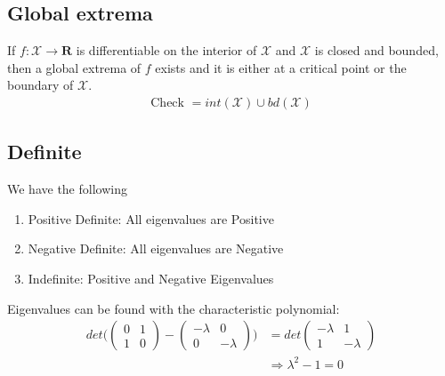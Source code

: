 \documentclass[8pt]{extarticle}
\newcommand{\R}{{\mathbb R}}
\newcommand{\X}{{\mathcal X}}
\newcommand{\ra}{{\rightarrow}}
\newcommand{\Ra}{{\Rightarrow}}
\def\R{\mathbf{R}}
\begin{document}
\begin{multicols*}{3}
  \subsection{Global extrema}
  If $f: \X \ra \R$ is differentiable on the interior
  of $\X$ and $\X$ is closed and bounded, then a global
  extrema of $f$ exists and it is either at a critical point
  or the boundary of $\X$.
  \begin{align*}
    \text{Check } = int(\X) \cup bd(\X)
  \end{align*}
  \subsection{Definite}
  We have the following
  \begin{enumerate}[label=(\arabic*)]
    \item Positive Definite: All eigenvalues are Positive
    \item Negative Definite: All eigenvalues are Negative
    \item Indefinite: Positive and Negative Eigenvalues
  \end{enumerate}
  Eigenvalues can be found with the characteristic polynomial:
  \begin{align*}
    det \Bigg(
    \begin{pmatrix}
      0 & 1 \\
      1 & 0
    \end{pmatrix}
    -
    \begin{pmatrix}
      -\lambda & 0         \\
      0        & - \lambda
    \end{pmatrix}
    \Bigg)
     & =
    det
    \begin{pmatrix}
      - \lambda & 1         \\
      1         & - \lambda
    \end{pmatrix} \\
     & \Ra \lambda^2 - 1 = 0   \\
  \end{align*}

\end{multicols*}
\end{document}
